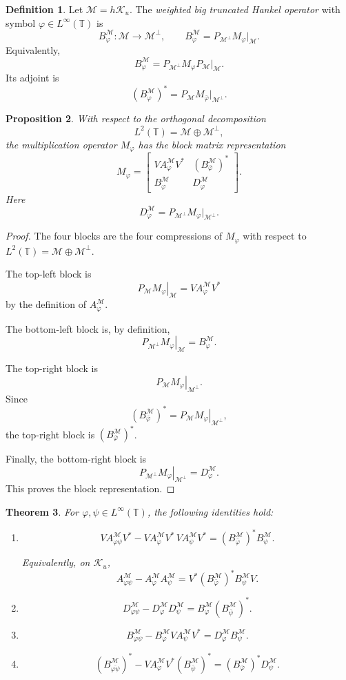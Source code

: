 \documentclass[12pt]{amsart}
\newtheorem{theorem}{Theorem}[section]
\newtheorem{proposition}[theorem]{Proposition}
\theoremstyle{definition}
\newtheorem{definition}[theorem]{Definition}
\theoremstyle{remark}
\def \T{\mathbb{T}}
\newcommand{\clm}{\mathcal{M}}
\newcommand{\clk}{\mathcal{K}}
\newcommand{\vp}{\varphi}
\newcommand\restr[2]{\ensuremath{\left.#1\right|_{#2}}}
\numberwithin{equation}{section}
\begin{document}
\begin{definition}
Let $\clm=h\clk_u$. The \emph{weighted big truncated Hankel operator}
with symbol $\vp\in L^\infty(\T)$ is
\[
B_\vp^\clm:\clm\to\clm^\perp,\qquad
B_\vp^\clm=P_{\clm^\perp}M_\vp\big|_{\clm}.
\]
Equivalently,
\[
B_\vp^\clm=P_{\clm^\perp}M_\vp P_\clm\big|_{\clm}.
\]
Its adjoint is
\[
(B_\vp^\clm)^*
=
P_\clm M_{\bar\vp}\big|_{\clm^\perp}.
\]
\end{definition}

\begin{proposition}\label{prop:block_matrix}
With respect to the orthogonal decomposition
\[
L^2(\T)=\clm\oplus\clm^\perp,
\]
the multiplication operator $M_\vp$ has the block matrix representation
\[
M_\vp
=
\begin{bmatrix}
V A_\vp^\clm V^* & (B_{\bar\vp}^\clm)^*\\
B_\vp^\clm & D_\vp^\clm
\end{bmatrix}.
\]
Here
\[
D_\vp^\clm=P_{\clm^\perp}M_\vp\big|_{\clm^\perp}.
\]
\end{proposition}

\begin{proof}
The four blocks are the four compressions of $M_\vp$ with respect to
$L^2(\T)=\clm\oplus\clm^\perp$.

The top-left block is
\[
\restr{P_\clm M_\vp}{\clm}
=
V A_\vp^\clm V^*
\]
by the definition of $A_\vp^\clm$.

The bottom-left block is, by definition,
\[
\restr{P_{\clm^\perp}M_\vp}{\clm}
=
B_\vp^\clm.
\]

The top-right block is
\[
\restr{P_\clm M_\vp}{\clm^\perp}.
\]
Since
\[
(B_{\bar\vp}^\clm)^*
=
\restr{P_\clm M_\vp}{\clm^\perp},
\]
the top-right block is $(B_{\bar\vp}^\clm)^*$.

Finally, the bottom-right block is
\[
\restr{P_{\clm^\perp}M_\vp}{\clm^\perp}
=
D_\vp^\clm.
\]
This proves the block representation.
\end{proof}



\begin{theorem}\label{thm:block_relations}
For $\vp,\psi\in L^\infty(\T)$, the following identities hold:
\begin{enumerate}
\item
\[
V A_{\vp\psi}^\clm V^* - V A_\vp^\clm V^*\,V A_\psi^\clm V^* =(B_{\bar\vp}^\clm)^*B_\psi^\clm.
\]

Equivalently, on $\clk_u$,
\[
A_{\vp\psi}^\clm-A_\vp^\clm A_\psi^\clm = V^*(B_{\bar\vp}^\clm)^*B_\psi^\clm V.
\]

\item
\[
D_{\vp\psi}^\clm-D_\vp^\clm D_\psi^\clm = B_\vp^\clm (B_{\bar\psi}^\clm)^*.
\]

\item
\[
B_{\vp\psi}^\clm - B_\vp^\clm V A_\psi^\clm V^*
=D_\vp^\clm B_\psi^\clm.
\]

\item
\[
(B_{\overline{\vp\psi}}^\clm)^* - V A_\vp^\clm V^*(B_{\bar\psi}^\clm)^* = (B_{\bar\vp}^\clm)^*D_\psi^\clm.
\]
\end{enumerate}
\end{theorem}
\end{document}
